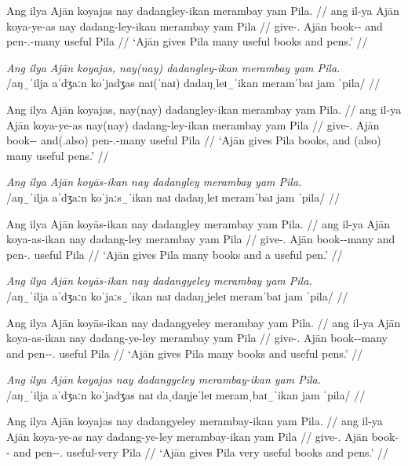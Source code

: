 \documentclass[12pt,a4paper]{scrartcl}
\newcommand{\PargI}{{\Parg}.{\Inan}}
\newcommand{\TsgM}{{\Tsg}.{\M}}
\begin{document}
\gla Ang ilya Ajān koyajas nay dadangley-ikan merambay yam Pila. //
\glb ang il-ya Ajān koya-ye-as nay dadang-ley-ikan merambay yam Pila //
\glc \AgtT{} give-\TsgM{} Ajān book-\Pl{}-\Parg{} and pen-\PargI{}-many useful \Dat{} Pila //
\glft `Ajān gives Pila many useful books and pens.' //
\endgl\xe

\ex\begingl
\glpreamble \textit{Ang ilya Ajān koyajas, nay(nay) dadangley-ikan merambay yam Pila.}\\
	/aŋ‿ˈilja aˈdʒaːn koˈjadʒas naɪ(ˈnaɪ) dadaŋˌleɪ‿ˈikan meramˈbaɪ jam ˈpila/ //

\gla Ang ilya Ajān koyajas, nay(nay) dadangley-ikan merambay yam Pila. //
\glb ang il-ya Ajān koya-ye-as nay(nay) dadang-ley-ikan merambay yam Pila //
\glc \AgtT{} give-\TsgM{} Ajān book-\Pl{}-\Parg{} and(.also) pen-\PargI{}-many useful \Dat{} Pila //
\glft `Ajān gives Pila books, and (also) many useful pens.' //
\endgl\xe

\ex\begingl
\glpreamble \textit{Ang ilya Ajān koyās-ikan nay dadangley merambay yam Pila.}\\
	/aŋ‿ˈilja aˈdʒaːn koˈjaːs‿ˈikan naɪ dadaŋˌleɪ meramˈbaɪ jam ˈpila/ //

\gla Ang ilya Ajān koyās-ikan nay dadangley merambay yam Pila. //
\glb ang il-ya Ajān koya-as-ikan nay dadang-ley merambay yam Pila //
\glc \AgtT{} give-\TsgM{} Ajān book-\Parg{}-many and pen-\PargI{} useful \Dat{} Pila //
\glft `Ajān gives Pila many books and a useful pen.' //
\endgl\xe

\ex\begingl
\glpreamble \textit{Ang ilya Ajān koyās-ikan nay dadangyeley merambay yam Pila.}\\
	/aŋ‿ˈilja aˈdʒaːn koˈjaːs‿ˈikan naɪ dadaŋˌjeleɪ meramˈbaɪ jam ˈpila/ //

\gla Ang ilya Ajān koyās-ikan nay dadangyeley merambay yam Pila. //
\glb ang il-ya Ajān koya-as-ikan nay dadang-ye-ley merambay yam Pila //
\glc \AgtT{} give-\TsgM{} Ajān book-\Parg{}-many and pen-\Pl{}-\PargI{} useful \Dat{} Pila //
\glft `Ajān gives Pila many books and useful pens.' //
\endgl\xe

\ex\begingl
\glpreamble \textit{Ang ilya Ajān koyajas nay dadangyeley merambay-ikan yam Pila.}\\
	/aŋ‿ˈilja aˈdʒaːn koˈjadʒas naɪ daˌdaŋjeˈleɪ meramˌbaɪ‿ˈikan jam ˈpila/ //

\gla Ang ilya Ajān koyajas nay dadangyeley merambay-ikan yam Pila. //
\glb ang il-ya Ajān koya-ye-as nay dadang-ye-ley merambay-ikan yam Pila //
\glc \AgtT{} give-\TsgM{} Ajān book-\Pl{}-\Parg{} and pen-\Pl{}-\PargI{} useful-very \Dat{} Pila //
\glft `Ajān gives Pila very useful books and pens.' //
\endgl\xe
\end{document}
